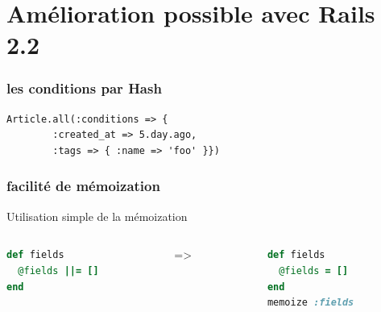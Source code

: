 \documentclass{beamer}
\begin{document}
\section{Amélioration possible avec Rails 2.2}

\begin{frame}[fragile]
    \frametitle{les conditions par Hash}
    \begin{lstlisting}[Language=Ruby]
Article.all(:conditions => { 
        :created_at => 5.day.ago,
        :tags => { :name => 'foo' }})
    \end{lstlisting}
\end{frame}

\begin{frame}[fragile]
    \frametitle{facilité de mémoization}
    Utilisation simple de la mémoization
    \begin{columns}
        \begin{column}[l]{4cm}
            \begin{lstlisting}[language=Ruby, frame=single]
def fields
  @fields ||= []
end
            \end{lstlisting}
        \end{column}
        \begin{column}[c]{1cm}
         =>
        \end{column}
        \begin{column}[r]{4cm}
            \begin{lstlisting}[language=Ruby, frame=single]
def fields
  @fields = []
end
memoize :fields
            \end{lstlisting}
        \end{column}
    \end{columns}

\end{frame}
\end{document}
